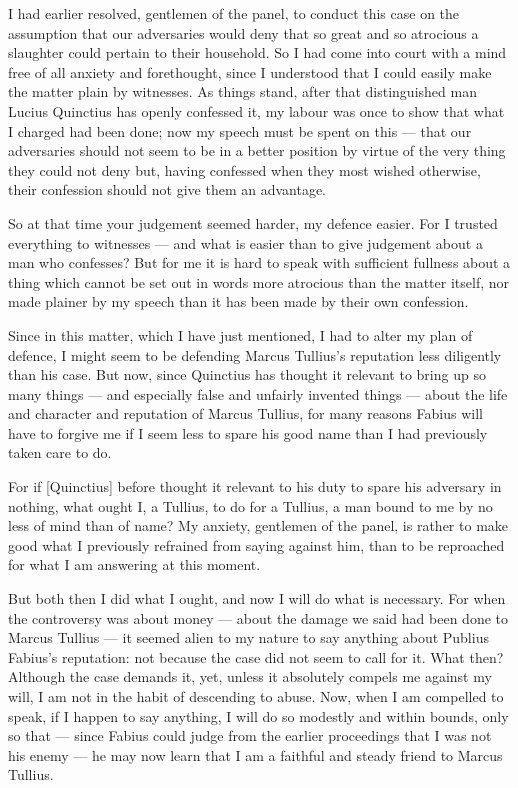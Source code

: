 
 I had earlier resolved, gentlemen of the panel, to conduct this case on the assumption that our adversaries would deny that so great and so atrocious a slaughter could pertain to their household. So I had come into court with a mind free of all anxiety and forethought, since I understood that I could easily make the matter plain by witnesses. As things stand, after that distinguished man Lucius Quinctius has openly confessed it, my labour was once to show that what I charged had been done; now my speech must be spent on this --- that our adversaries should not seem to be in a better position by virtue of the very thing they could not deny but, having confessed when they most wished otherwise, their confession should not give them an advantage.

 So at that time your judgement seemed harder, my defence easier. For I trusted everything to witnesses --- and what is easier than to give judgement about a man who confesses? But for me it is hard to speak with sufficient fullness about a thing which cannot be set out in words more atrocious than the matter itself, nor made plainer by my speech than it has been made by their own confession.

 Since in this matter, which I have just mentioned, I had to alter my plan of defence, I might seem to be defending Marcus Tullius's reputation less diligently than his case. But now, since Quinctius has thought it relevant to bring up so many things --- and especially false and unfairly invented things --- about the life and character and reputation of Marcus Tullius, for many reasons Fabius will have to forgive me if I seem less to spare his good name than I had previously taken care to do.

 For if [Quinctius] before thought it relevant to his duty to spare his adversary in nothing, what ought I, a Tullius, to do for a Tullius, a man bound to me by no less of mind than of name? My anxiety, gentlemen of the panel, is rather to make good what I previously refrained from saying against him, than to be reproached for what I am answering at this moment.

 But both then I did what I ought, and now I will do what is necessary. For when the controversy was about money --- about the damage we said had been done to Marcus Tullius --- it seemed alien to my nature to say anything about Publius Fabius's reputation: not because the case did not seem to call for it. What then? Although the case demands it, yet, unless it absolutely compels me against my will, I am not in the habit of descending to abuse. Now, when I am compelled to speak, if I happen to say anything, I will do so modestly and within bounds, only so that --- since Fabius could judge from the earlier proceedings that I was not his enemy --- he may now learn that I am a faithful and steady friend to Marcus Tullius.


